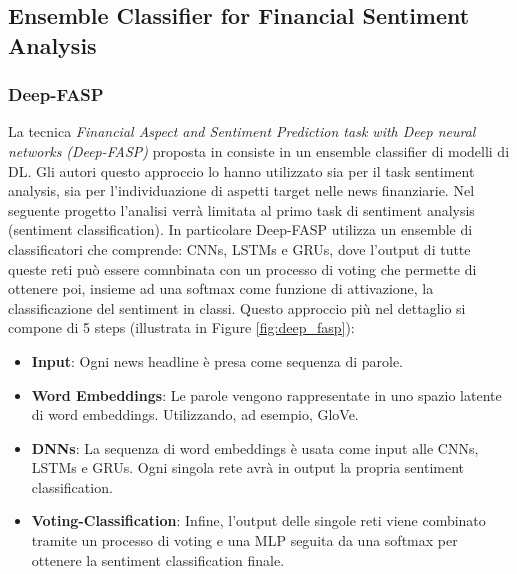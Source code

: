 \newpage


\subsection{Ensemble Classifier for Financial Sentiment Analysis}
\subsubsection{Deep-FASP}
La tecnica \textit{Financial Aspect and Sentiment Prediction task with Deep neural networks} \textit{(Deep-FASP)} proposta in \cite{10.1145/3184558.3191829} consiste in un ensemble classifier di modelli di DL. Gli autori questo  approccio lo hanno utilizzato sia per il task sentiment analysis, sia per l'individuazione di aspetti target nelle news finanziarie. Nel seguente progetto l'analisi verrà limitata al primo task di sentiment analysis (sentiment classification).\newline
In particolare Deep-FASP utilizza un ensemble di classificatori che comprende: CNNs, LSTMs e GRUs, dove l'output di tutte queste reti può essere comnbinata con un processo di voting che permette di ottenere poi, insieme ad una softmax come funzione di attivazione, la classificazione del sentiment in classi. 
\newline
Questo approccio più nel dettaglio si compone di 5 steps (illustrata in Figure \ref{fig:deep_fasp}):
\begin{itemize}
    \item \textbf{Input}: Ogni news headline è presa come sequenza di parole.
    \item \textbf{Word Embeddings}: Le parole vengono rappresentate in uno spazio latente di word embeddings. Utilizzando, ad esempio, GloVe.
    \item \textbf{DNNs}: La sequenza di word embeddings è usata come input alle CNNs, LSTMs e GRUs. Ogni singola rete avrà in output la propria sentiment classification.
    \item \textbf{Voting-Classification}: Infine, l'output delle singole reti viene combinato tramite un processo di voting e una MLP seguita da una softmax per ottenere la sentiment classification finale.
\end{itemize}

